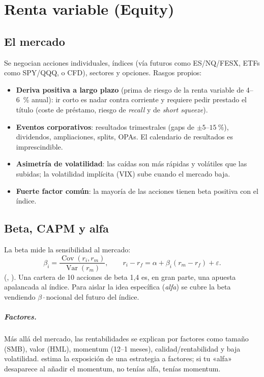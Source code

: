 \chapter{Renta variable (Equity)}\label{cap:equity}

\section{El mercado}
Se negocian acciones individuales, índices (vía futuros como ES/NQ/FESX, ETFs como SPY/QQQ, o CFD),
sectores y opciones. Rasgos propios:
\begin{itemize}
\item \textbf{Deriva positiva a largo plazo} (prima de riesgo de la renta variable de 4--6~\% anual): ir
  corto es nadar contra corriente y requiere pedir prestado el título (coste de préstamo, riesgo de
  \emph{recall} y de \emph{short squeeze}).
\item \textbf{Eventos corporativos}: resultados trimestrales (gaps de $\pm5$--$15~\%$), dividendos,
  ampliaciones, splits, OPAs. El calendario de resultados es imprescindible.
\item \textbf{Asimetría de volatilidad}: las caídas son más rápidas y volátiles que las subidas; la
  volatilidad implícita (VIX) sube cuando el mercado baja.
\item \textbf{Fuerte factor común}: la mayoría de las acciones tienen beta positiva con el índice.
\end{itemize}

\section{Beta, CAPM y alfa}
La beta mide la sensibilidad al mercado:
\begin{equation}
\beta_i = \frac{\operatorname{Cov}(r_i,r_m)}{\operatorname{Var}(r_m)},\qquad
r_i - r_f = \alpha + \beta_i(r_m-r_f)+\varepsilon .
\end{equation}
(, ). Una cartera de 10 acciones de beta 1,4 es, en gran parte, una
apuesta apalancada al índice. Para aislar la idea específica (\emph{alfa}) se cubre la beta vendiendo
$\beta\cdot$nocional del futuro del índice.

\paragraph{Factores.} Más allá del mercado, las rentabilidades se explican por factores como tamaño
(SMB), valor (HML), momentum (12--1 meses), calidad/rentabilidad y baja volatilidad.
 estima la exposición de una estrategia a factores; si tu «alfa»
desaparece al añadir el momentum, no tenías alfa, tenías momentum.

